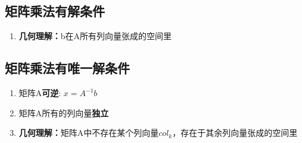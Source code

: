 \documentclass{book}
\begin{document}
\subsection{矩阵乘法有解条件}

\begin{enumerate}
  \item \textbf{几何理解：}b在A所有列向量张成的空间里
\end{enumerate}

\subsection{矩阵乘法有唯一解条件}
\begin{enumerate}
  \item 矩阵A\textbf{可逆}: $x=A^{-1}b$ 
  \item 矩阵A所有的列向量\textbf{独立}
  \item \textbf{几何理解：}矩阵A中不存在某个列向量$col_k$，存在于其余列向量张成的空间里
\end{enumerate}
\end{document}
